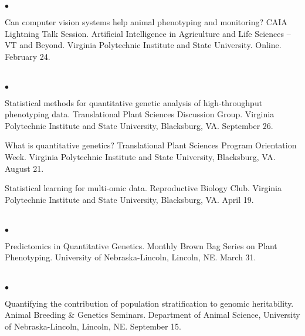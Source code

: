\documentclass[margin,line,10pt]{res}
\newenvironment{list2}{
  \begin{list}{$\bullet$}{%
      \setlength{\itemsep}{0in}
      \setlength{\parsep}{0in} \setlength{\parskip}{0in}
      \setlength{\topsep}{0in} \setlength{\partopsep}{0in} 
      \setlength{\leftmargin}{0.2in}}}{\end{list}}
\begin{document}
\begin{resume}
\begin{list2}
  \vspace{0.5cm}


  \item Can computer vision systems help animal phenotyping and monitoring? CAIA Lightning Talk Session. Artificial Intelligence in Agriculture and Life Sciences – VT and Beyond. Virginia Polytechnic Institute and State University. Online. February 24. 
\end{list2}





\section{}
\begin{list2}
\item Statistical methods for quantitative genetic analysis of high-throughput phenotyping data. Translational Plant Sciences Discussion Group. Virginia Polytechnic Institute and State University, Blacksburg, VA. September 26.

  \vspace{0.5cm}

\item What is quantitative genetics? Translational Plant Sciences Program Orientation Week. Virginia Polytechnic Institute and State University, Blacksburg, VA. August 21.
  
  \vspace{0.5cm}

\item Statistical learning for multi-omic data. Reproductive Biology Club. Virginia Polytechnic Institute and State University, Blacksburg, VA. April 19. 
\end{list2}  

\section{}
\begin{list2}
\item Predictomics in Quantitative Genetics. Monthly Brown Bag Series on Plant Phenotyping. University of Nebraska-Lincoln, Lincoln, NE. March 31. 
\end{list2}  

\section{}
\begin{list2}
\item  Quantifying the contribution of population stratification to genomic heritability. Animal Breeding \& Genetics Seminars. Department of Animal Science, University of Nebraska-Lincoln, Lincoln, NE. September 15. 
\end{list2}  


\end{resume}
\end{document}
